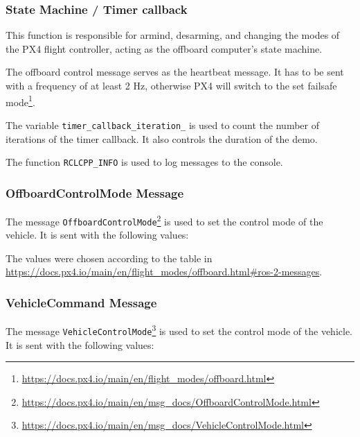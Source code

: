 \documentclass[a4paper]{article}
\begin{document}
\subsubsection{State Machine / Timer callback}

This function is responsible for armind, desarming, and changing the modes of the PX4 flight controller, acting as the offboard computer's state machine. 

The offboard control message serves as the heartbeat message. It has to be sent with a frequency of at least 2 Hz, otherwise PX4 will switch to the set failsafe mode\footnote{\url{https://docs.px4.io/main/en/flight_modes/offboard.html}}. 



The variable \verb|timer_callback_iteration_| is used to count the number of iterations of the timer callback. 
It also controls the duration of the demo. 

The function \verb|RCLCPP_INFO| is used to log messages to the console.

\subsubsection{OffboardControlMode Message}

The message \verb|OffboardControlMode|\footnote{\url{https://docs.px4.io/main/en/msg_docs/OffboardControlMode.html}} is used to set the control mode of the vehicle. 
It is sent with the following values: 



The values were chosen according to the table in \url{https://docs.px4.io/main/en/flight_modes/offboard.html\#ros-2-messages}.

\subsubsection{VehicleCommand Message}

The message \verb|VehicleControlMode|\footnote{\url{https://docs.px4.io/main/en/msg_docs/VehicleControlMode.html}} is used to set the control mode of the vehicle.
It is sent with the following values:


\end{document}
